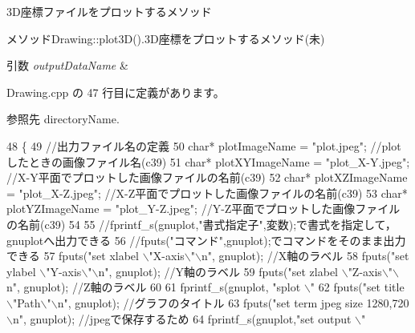 3\-D座標ファイルをプロットするメソッド 

メソッド\-Drawing\-::plot3\-D().3\-D座標をプロットするメソッド(未)


\begin{DoxyParams}{引数}
{\em output\-Data\-Name} & \\
\hline
\end{DoxyParams}


 Drawing.\-cpp の 47 行目に定義があります。



参照先 directory\-Name.


\begin{DoxyCode}
48 \{
49     \textcolor{comment}{//出力ファイル名の定義}
50     \textcolor{keywordtype}{char}* plotImageName = \textcolor{stringliteral}{"plot.jpeg"}; \textcolor{comment}{//plotしたときの画像ファイル名(c39)}
51     \textcolor{keywordtype}{char}* plotXYImageName = \textcolor{stringliteral}{"plot\_X-Y.jpeg"}; \textcolor{comment}{//X-Y平面でプロットした画像ファイルの名前(c39)}
52     \textcolor{keywordtype}{char}* plotXZImageName = \textcolor{stringliteral}{"plot\_X-Z.jpeg"}; \textcolor{comment}{//X-Z平面でプロットした画像ファイルの名前(c39)}
53     \textcolor{keywordtype}{char}* plotYZImageName = \textcolor{stringliteral}{"plot\_Y-Z.jpeg"}; \textcolor{comment}{//Y-Z平面でプロットした画像ファイルの名前(c39)}
54 
55     \textcolor{comment}{//fprintf\_s(gnuplot,"書式指定子",変数);で書式を指定して，gnuplotへ出力できる}
56     \textcolor{comment}{//fputs("コマンド",gnuplot);でコマンドをそのまま出力できる}
57     fputs(\textcolor{stringliteral}{"set xlabel \(\backslash\)"X-axis\(\backslash\)"\(\backslash\)n"}, gnuplot); \textcolor{comment}{//X軸のラベル}
58     fputs(\textcolor{stringliteral}{"set ylabel \(\backslash\)"Y-axis\(\backslash\)"\(\backslash\)n"}, gnuplot); \textcolor{comment}{//Y軸のラベル}
59     fputs(\textcolor{stringliteral}{"set zlabel \(\backslash\)"Z-axis\(\backslash\)"\(\backslash\)n"}, gnuplot); \textcolor{comment}{//Z軸のラベル}
60 
61     fprintf\_s(gnuplot, \textcolor{stringliteral}{"splot \(\backslash\)"%
62     fputs(\textcolor{stringliteral}{"set title \(\backslash\)"Path\(\backslash\)"\(\backslash\)n"}, gnuplot); \textcolor{comment}{//グラフのタイトル}
63     fputs(\textcolor{stringliteral}{"set term jpeg size 1280,720\(\backslash\)n"}, gnuplot); \textcolor{comment}{//jpegで保存するため}
64     fprintf\_s(gnuplot,\textcolor{stringliteral}{"set output \(\backslash\)"%
}}
\end{DoxyCode}
